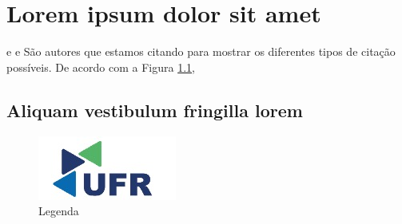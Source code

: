 \chapter{Lorem ipsum dolor sit amet}
\cite{godinho2016vida} e \cite{mello2006metodologia} e 
São autores que estamos citando para mostrar os diferentes tipos de citação possíveis. De acordo com a Figura \ref{fig:my_label}, 



\section{Aliquam vestibulum fringilla lorem}

\begin{figure}
    \centering
    \includegraphics{ufr/images/logo.jpeg}
    \caption{Legenda}
    \label{fig:my_label}
\end{figure}

